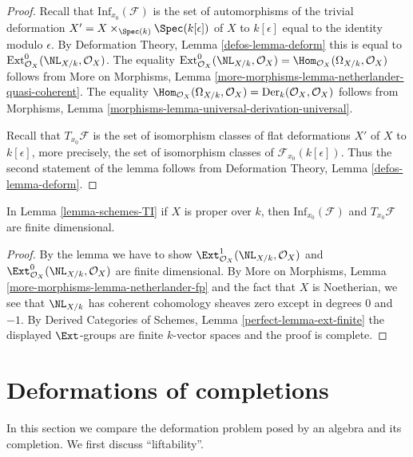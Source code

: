 \begin{proof}
Recall that $\text{Inf}_{x_0}(\mathcal{F})$ is the set of
automorphisms of the trivial deformation
$X' = X \times_{\Spec(k)} \Spec(k[\epsilon])$ of $X$ to $k[\epsilon]$
equal to the identity modulo $\epsilon$.
By Deformation Theory, Lemma \ref{defos-lemma-deform}
this is equal to $\text{Ext}^0_{\mathcal{O}_X}(\NL_{X/k}, \mathcal{O}_X)$.
The equality $\text{Ext}^0_{\mathcal{O}_X}(\NL_{X/k}, \mathcal{O}_X) =
\Hom_{\mathcal{O}_X}(\Omega_{X/k}, \mathcal{O}_X)$ follows from
More on Morphisms, Lemma
\ref{more-morphisms-lemma-netherlander-quasi-coherent}.
The equality
$\Hom_{\mathcal{O}_X}(\Omega_{X/k}, \mathcal{O}_X) =
\text{Der}_k(\mathcal{O}_X, \mathcal{O}_X)$
follows from Morphisms, Lemma
\ref{morphisms-lemma-universal-derivation-universal}.

\medskip\noindent
Recall that $T_{x_0}\mathcal{F}$ is the set of isomorphism classes
of flat deformations $X'$ of $X$ to $k[\epsilon]$, more precisely,
the set of isomorphism classes of $\mathcal{F}_{x_0}(k[\epsilon])$.
Thus the second statement of the lemma follows from
Deformation Theory, Lemma \ref{defos-lemma-deform}.
\end{proof}

\begin{lemma}
\label{lemma-proper-schemes-TI}
In Lemma \ref{lemma-schemes-TI} if $X$ is proper over $k$, then
$\text{Inf}_{x_0}(\mathcal{F})$ and $T_{x_0}\mathcal{F}$ are
finite dimensional.
\end{lemma}

\begin{proof}
By the lemma we have to show
$\Ext^1_{\mathcal{O}_X}(\NL_{X/k}, \mathcal{O}_X)$ and
$\Ext^0_{\mathcal{O}_X}(\NL_{X/k}, \mathcal{O}_X)$ are finite
dimensional. By More on Morphisms, Lemma
\ref{more-morphisms-lemma-netherlander-fp}
and the fact that $X$ is Noetherian, we see that
$\NL_{X/k}$ has coherent cohomology sheaves zero except
in degrees $0$ and $-1$.
By Derived Categories of Schemes, Lemma \ref{perfect-lemma-ext-finite}
the displayed $\Ext$-groups are finite $k$-vector spaces
and the proof is complete.
\end{proof}



\section{Deformations of completions}
\label{section-compare}

\noindent
In this section we compare the deformation problem posed
by an algebra and its completion.
We first discuss ``liftability''.

